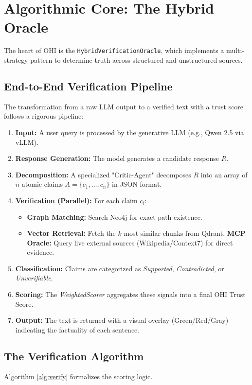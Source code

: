 \documentclass[10pt, a4paper, twocolumn]{article}
\begin{document}
\section{Algorithmic Core: The Hybrid Oracle}

The heart of OHI is the \texttt{HybridVerificationOracle}, which implements a multi-strategy pattern to determine truth across structured and unstructured sources.

\subsection{End-to-End Verification Pipeline}
The transformation from a raw LLM output to a verified text with a trust score follows a rigorous pipeline:
\begin{enumerate}
    \item \textbf{Input:} A user query is processed by the generative LLM (e.g., Qwen 2.5 via vLLM).
    \item \textbf{Response Generation:} The model generates a candidate response $R$.
    \item \textbf{Decomposition:} A specialized "Critic-Agent" decomposes $R$ into an array of $n$ atomic claims $A = \{c_1, \dots, c_n\}$ in JSON format.
    \item \textbf{Verification (Parallel):} For each claim $c_i$:
        \begin{itemize}
            \item \textbf{Graph Matching:} Search Neo4j for exact path existence.
            \item \textbf{Vector Retrieval:} Fetch the $k$ most similar chunks from Qdrant.
            \textbf{MCP Oracle:} Query live external sources (Wikipedia/Context7) for direct evidence.
        \end{itemize}
    \item \textbf{Classification:} Claims are categorized as \textit{Supported}, \textit{Contradicted}, or \textit{Unverifiable}.
    \item \textbf{Scoring:} The \textit{WeightedScorer} aggregates these signals into a final OHI Trust Score.
    \item \textbf{Output:} The text is returned with a visual overlay (Green/Red/Gray) indicating the factuality of each sentence.
\end{enumerate}

\subsection{The Verification Algorithm}
Algorithm \ref{alg:verify} formalizes the scoring logic.
\end{document}
